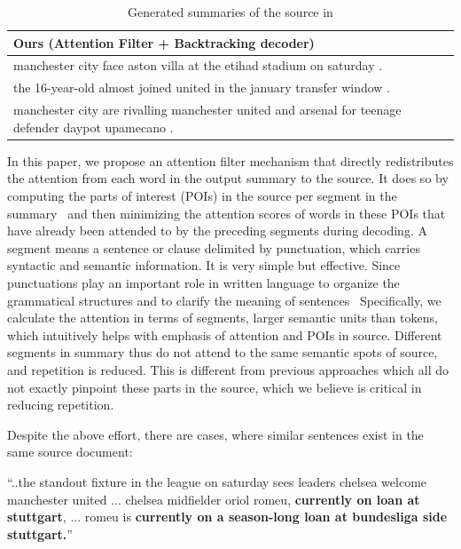 \begin{table}[th!]
\begin{center}
\begin{tabular}{|l|}
\hline \bf Ours (Attention Filter + Backtracking decoder) \\
\hline manchester city face aston villa at the etihad stadium on saturday . \\
       the 16-year-old almost joined united in the january transfer window . \\
	   manchester city are rivalling manchester united and arsenal for teenage defender daypot upamecano .\\
\hline
\end{tabular}
\end{center}
\caption{\label{tab:strong_methods} Generated summaries of the source in }
\end{table}

In this paper, we propose an attention filter mechanism that directly 
redistributes the attention from each word in the output summary to the source. 
It does so by computing the parts of interest (POIs) in the source
per segment in the summary~
and then minimizing the attention scores of
words in these POIs that have already been attended to by the preceding 
segments during decoding. 
A segment means a sentence or clause delimited by punctuation,
which carries syntactic and semantic information. 
It is very simple but effective. Since punctuations 
play an important role in written language to organize 
the grammatical structures and to clarify the meaning of sentences~\cite{briscoe1996,Kim19,LiWE19}
Specifically, we calculate the attention in terms of segments, larger semantic units than tokens, 
which intuitively helps with emphasis of attention and POIs in source.
Different segments in summary thus do not attend to the same semantic spots
of source, and repetition is reduced. 
This is different from previous approaches
which all do not exactly pinpoint these parts in the source,
which we believe is critical in reducing repetition. 

Despite the above effort, there are cases, where similar sentences 
exist in the same source document:
\begin{example}
\label{ex:repeatsrc}
\small{``..the standout fixture in the league on saturday sees leaders 
	   chelsea welcome manchester united ... chelsea midfielder oriol romeu, 
\textbf{currently on loan at stuttgart}, ... romeu is 
\textbf{currently on a season-long loan at bundesliga side stuttgart.}''} 
\end{example}

